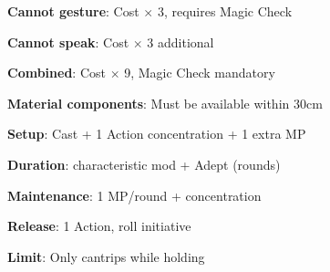 \documentclass[10pt,a4paper,landscape]{article}
\begin{document}
\begin{multicols}{3}
		\begin{tcolorbox}[title=IMPEDIMENTS]
			\textbf{Cannot gesture}: Cost $\times$ 3, requires Magic Check
			
			\textbf{Cannot speak}: Cost $\times$ 3 additional
			
			\textbf{Combined}: Cost $\times$ 9, Magic Check mandatory
			
			\textbf{Material components}: Must be available within 30cm
		\end{tcolorbox}
		
		\begin{tcolorbox}[title=HOLDING MAGIC]
			\textbf{Setup}: Cast + 1 Action concentration + 1 extra MP
			
			\textbf{Duration}: characteristic mod + Adept (rounds)
			
			\textbf{Maintenance}: 1 MP/round + concentration
			
			\textbf{Release}: 1 Action, roll initiative
			
			\textbf{Limit}: Only cantrips while holding
		\end{tcolorbox}
		
	\end{multicols}
	
\end{document}
